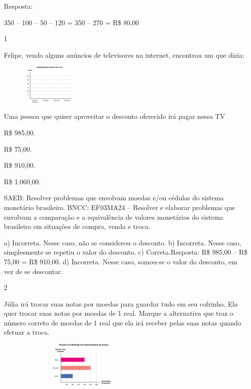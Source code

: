 {\begin{escolha}

Resposta:

350 -- 100 -- 50 -- 120 = 350 -- 270 = R\$ 80,00


\num{1}

Felipe, vendo alguns anúncios de televisores na internet, encontrou um que dizia:


\includegraphics[width=1.95850in,height=0.77507in]{media/image81.png}

Uma pessoa que quiser aproveitar o desconto oferecido irá pagar nessa TV

\begin{escolha}

\item
  R\$ 985,00.
\item
  R\$ 75,00.
\item
  R\$ 910,00.
\item
  R\$ 1.060,00.
\end{escolha}

SAEB: Resolver problemas que envolvam moedas e/ou cédulas do sistema monetário brasileiro. 
BNCC: EF03MA24 -- Resolver e elaborar problemas que envolvam a comparação e a equivalência de
valores monetários do sistema brasileiro em situações de compra, venda e troca.

a) Incorreta. Nesse caso, não se considerou o desconto.
b) Incorreta. Nesse caso, simplesmente se repetiu o valor do desconto.
c) Correta.Resposta: R\$ 985,00 -- R\$ 75,00 = R\$ 910,00.
d) Incorreta. Nesse caso, somou-se o valor do desconto, em vez de se descontar.

\num{2}

Júlia irá trocar suas notas por moedas para guardar tudo em seu
cofrinho. Ela quer trocar suas notas por moedas de 1 real. Marque a
alternativa que traz o número correto de moedas de 1 real que ela
irá receber pelas suas notas quando efetuar a troca.


\includegraphics[width=3.34196in,height=0.88341in]{media/image82.png}


\end{escolha}}
